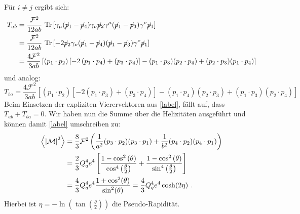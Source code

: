 Für $i \neq j$ ergibt sich:
\begin{equation}
\begin{aligned}
T_{ab} &= \frac{\mathcal{F}^2}{12ab}~\text{Tr}\left[\gamma_\mu(\cancel{p}_1- \cancel{p}_4)  \gamma_\nu \cancel{p}_2 \gamma^\mu (\cancel{p}_1- \cancel{p}_3)  \gamma^\nu \cancel{p}_1 \right] \\
&=\frac{\mathcal{F}^2}{12ab}~\text{Tr}\left[ -2 \cancel{p}_2 \gamma_\nu (\cancel{p}_1- \cancel{p}_4)   (\cancel{p}_1- \cancel{p}_3)  \gamma^\nu \cancel{p}_1 \right] \\
&=  \frac{4\mathcal{F}^2}{3ab} \left[\left( p_1\cdot p_2\right) \left[ -2 \left( p_1 \cdot p_4 \right) + \left(p_3 \cdot p_4\right)\right] - (p_1\cdot p_3)(p_2\cdot p_4) + (p_2\cdot p_3)(p_1\cdot p_4)\right]
\end{aligned}
\end{equation}
und analog:
\begin{equation}
T_{ba} = \frac{4\mathcal{F}^2}{3ab} \left[\left( p_1\cdot p_2\right) \left[ -2 \left( p_1 \cdot p_3 \right) + \left(p_3 \cdot p_4\right)\right] - (p_1\cdot p_4)(p_2\cdot p_3) + (p_1\cdot p_3)(p_2\cdot p_4)\right]
\end{equation}
Beim Einsetzen der expliziten Vierervektoren aus \autoref{label}, fällt auf, dass $T_{ab} + T_{ba} = 0$. Wir haben nun die Summe über die Helizitäten ausgeführt und können damit \autoref{label} umschreiben zu:
\begin{equation}
\begin{aligned}
\left\langle  \abs{\mathcal{M}}^2\right\rangle &= \frac{8}{3}\mathcal{F}^2 \left(\frac{1}{a^2}(p_3\cdot p_2)(p_3\cdot p_1) + \frac{1}{b^2} (p_4\cdot p_2)(p_4\cdot p_1) \right) \\
&= \frac{2}{3}Q_q^4e^4\left[\frac{1-\cos^2\left(\theta\right)}{\cos^4\left(\frac{\theta}{2}\right)} + \frac{1-\cos^2\left(\theta\right)}{\sin^4\left(\frac{\theta}{2}\right)}\right] \\
&=\frac{4}{3} Q_q^4e^4\frac{1+\cos^2(\theta)}{\sin^2(\theta)} = \frac{4}{3} Q_q^4e^4\cosh(2\eta)~.
\end{aligned}
\end{equation}
Hierbei ist  $\eta = -\ln\left(\tan\left(\frac{\theta}{2}\right)\right)$ die Pseudo-Rapidität.
